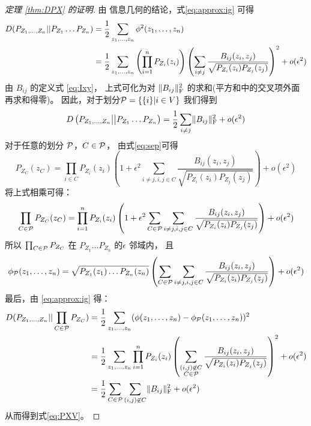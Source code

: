 \begin{proof}[定理 \ref{thm:DPX} 的证明]
由 信息几何的结论，式\eqref{eq:approx:ig} 可得
\begin{align*}
D(P_{Z_1,\dots, Z_n}|| P_{Z_1}\dots P_{Z_n}) & ={1 \over 2} \sum_{z_1,\dots,z_n}\phi^2(z_1,\dots, z_n) \\
& = {1\over 2}\sum_{z_1,\dots,z_n} \left(\prod_{i=1}^n  P_{Z_i} (z_i) \right) \left(\sum_{i\neq j}{B_{ij}(z_i, z_j) \over \sqrt{P_{Z_i}(z_i)P_{Z_j}(z_j)} }\right)^2 +o(\epsilon^2) 
\end{align*}
由 $B_{ij}$
的定义式 \eqref{eq:Ixy}，
上式可化为对 $\norm{B_{ij}}^2_{\mathrm{F}}$
的求和(平方和中的交叉项外面再求和得零)。
因此，对于划分$\P=\{\{i\}|i\in V\}$ 我们得到
\begin{equation}
D\left(P_{Z_1,\dots, Z_n}\big|\big| P_{Z_1}\dots P_{Z_n} \right) =
{1 \over 2} \sum_{i\neq j} \norm{B_{ij}}^2_{\mathrm{F}} + o(\epsilon^2)
\end{equation}
对于任意的划分 $\P$，$C\in \P$，
由式\eqref{eq:sep}可得
\begin{equation}
P_{Z_C}(z_C) = \prod_{i\in C} P_{Z_i}(z_i)
\left(1 + \epsilon^2 \sum_{i\neq j,i,j\in C} \frac{B_{ij}(z_i, z_j)}{\sqrt{P_{Z_i}(z_i)P_{Z_j}(z_j)}}
\right) + o(\epsilon^2)
\end{equation}
将上式相乘可得：
\begin{equation}
\prod_{C\in \P}P_{Z_C}(z_C) = \prod_{i=1}^n P_{Z_i}(z_i)
\left(1+\epsilon^2 \sum_{C\in\P}\sum_{i\neq j,i,j\in C}\frac{B_{ij}(z_i, z_j)}{\sqrt{P_{Z_i}(z_i)P_{Z_j}(z_j)}}
\right) + o(\epsilon^2)
\end{equation}
所以 $\prod_{C\in \P}P_{Z_C}$ 在 $P_{Z_1}\dots P_{Z_n}$ 的$\epsilon$ 邻域内，
且 $$\phi_{\P}(z_1,\dots, z_n)=
\sqrt{P_{Z_1}(z_1)\dots P_{Z_n}(z_n)}\left(\sum_{C\in\P}\sum_{i\neq j,i,j\in C}\frac{B_{ij}(z_i, z_j)}{\sqrt{P_{Z_i}(z_i)P_{Z_j}(z_j)}}\right)+o(\epsilon^2)$$
最后，由  \eqref{eq:approx:ig} 得：
\begin{align*}
D(P_{Z_1,\dots, Z_n}|| \prod_{C\in \P}P_{Z_C}) & ={1 \over 2} \sum_{z_1,\dots,z_n}(\phi(z_1,\dots, z_n)-\phi_{\P}(z_1, \dots, z_n))^2 \\
& = {1\over 2}\sum_{z_1,\dots,z_n} \prod_{i=1}^n  P_{Z_i} (z_i) \left(\sum_{\substack{(i,j) \not\in C\\ C\in \P}} {B_{ij}(z_i, z_j) \over \sqrt{P_{Z_i}(z_i)P_{Z_j}(z_j)} }\right)^2 +o(\epsilon^2) \\
& = \frac{1}{2} \sum_{C\in \P}\sum_{(i,j) \not\in C} \norm{B_{ij}}_{\mathrm{F}}^2 + o(\epsilon^2)
\end{align*}
从而得到式\eqref{eq:PXV}。
\end{proof}



